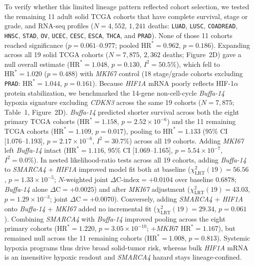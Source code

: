 \documentclass[10pt,twocolumn]{article}
\begin{document}
To verify whether this limited lineage pattern reflected cohort selection, we tested the remaining 11 adult solid TCGA cohorts that have complete survival, stage or grade, and RNA-seq profiles ($N = 4,552$, $1,241$ deaths: \texttt{LUAD}, \texttt{LUSC}, \texttt{COADREAD}, \texttt{HNSC}, \texttt{STAD}, \texttt{OV}, \texttt{UCEC}, \texttt{CESC}, \texttt{ESCA}, \texttt{THCA}, and \texttt{PRAD}). None of those 11 cohorts reached significance ($p = 0.061\text{--}0.977$; pooled $\text{HR}^* = 0.962$, $p = 0.186$). Expanding across all 19 solid TCGA cohorts ($N = 7,875$, $2,362$ deaths; Figure~2D) gave a null overall estimate ($\text{HR}^* = 1.048$, $p = 0.130$, $I^2 = 50.5\%$), which fell to $\text{HR}^* = 1.020$ ($p = 0.488$) with \textit{MKI67} control (18 stage/grade cohorts excluding \texttt{PRAD}: $\text{HR}^* = 1.044$, $p = 0.161$). Because \textit{HIF1A} mRNA poorly reflects HIF-1$\alpha$ protein stabilization, we benchmarked the 14-gene non-cell-cycle \textit{Buffa-14} hypoxia signature excluding \textit{CDKN3} \cite{buffa2010} across the same 19 cohorts ($N = 7,875$; Table~1, Figure~2D). \textit{Buffa-14} predicted shorter survival across both the eight primary TCGA cohorts ($\text{HR}^* = 1.158$, $p = 2.52 \times 10^{-6}$) and the 11 remaining TCGA cohorts ($\text{HR}^* = 1.109$, $p = 0.017$), pooling to $\text{HR}^* = 1.133$ ($95\%$ CI [1.076--1.193], $p = 2.17 \times 10^{-6}$, $I^2 = 30.7\%$) across all 19 cohorts. Adding \textit{MKI67} left \textit{Buffa-14} intact ($\text{HR}^* = 1.116$, $95\%$ CI [1.069--1.165], $p = 5.54 \times 10^{-7}$, $I^2 = 0.0\%$). In nested likelihood-ratio tests across all 19 cohorts, adding \textit{Buffa-14} to \textit{SMARCA4} + \textit{HIF1A} improved model fit both at baseline ($\chi^2_{\text{LRT}}(19) = 56.56$, $p = 1.33 \times 10^{-5}$; $N$-weighted joint $\Delta\text{C-index} = +0.0104$ over baseline $0.6878$; \textit{Buffa-14} alone $\Delta\text{C} = +0.0025$) and after \textit{MKI67} adjustment ($\chi^2_{\text{LRT}}(19) = 43.03$, $p = 1.29 \times 10^{-3}$; joint $\Delta\text{C} = +0.0070$). Conversely, adding \textit{SMARCA4} + \textit{HIF1A} onto \textit{Buffa-14} + \textit{MKI67} added no incremental fit ($\chi^2_{\text{LRT}}(19) = 29.34$, $p = 0.061$). Combining \textit{SMARCA4} with \textit{Buffa-14} improved pooling across the eight primary cohorts ($\text{HR}^* = 1.220$, $p = 3.05 \times 10^{-10}$; $+\textit{MKI67}$ $\text{HR}^* = 1.167$), but remained null across the 11 remaining cohorts ($\text{HR}^* = 1.008$, $p = 0.813$). Systemic hypoxia programs thus drive broad solid-tumor risk, whereas bulk \textit{HIF1A} mRNA is an insensitive hypoxic readout and \textit{SMARCA4} hazard stays lineage-confined.
\end{document}
